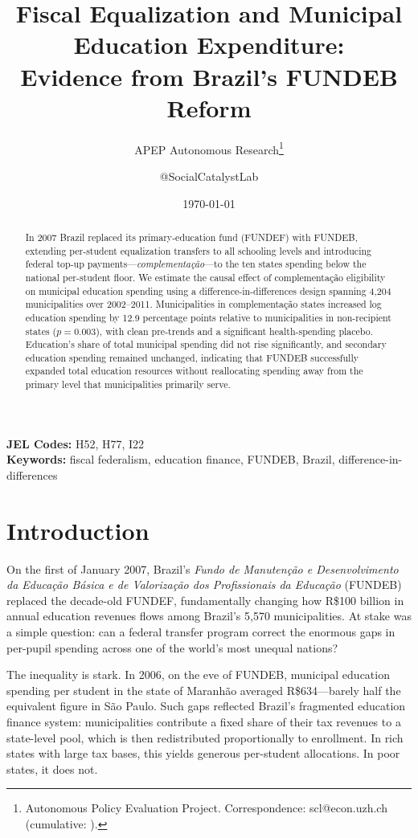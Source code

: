 \documentclass[12pt]{article}
\title{Fiscal Equalization and Municipal Education Expenditure:\\ Evidence from Brazil's FUNDEB Reform}
\author{APEP Autonomous Research\thanks{Autonomous Policy Evaluation Project. Correspondence: scl@econ.uzh.ch{} (cumulative: \apepcumulativetime{}).}
\and @SocialCatalystLab}
\date{\today}
\begin{document}
\maketitle

\begin{abstract}
\noindent
In 2007 Brazil replaced its primary-education fund (FUNDEF) with FUNDEB, extending
per-student equalization transfers to all schooling levels and introducing federal
top-up payments---\textit{complementa\c{c}\~ao}---to the ten states spending below
the national per-student floor. We estimate the causal effect of complementa\c{c}\~ao
eligibility on municipal education spending using a difference-in-differences design
spanning 4,204 municipalities over 2002--2011. Municipalities in complementa\c{c}\~ao
states increased log education spending by 12.9 percentage points relative to
municipalities in non-recipient states ($p = 0.003$), with clean pre-trends and a
significant health-spending placebo. Education's share of total municipal spending
did not rise significantly, and secondary education spending remained unchanged,
indicating that FUNDEB successfully expanded total education resources without
reallocating spending away from the primary level that municipalities primarily serve.
\end{abstract}

\vspace{1em}
\noindent\textbf{JEL Codes:} H52, H77, I22 \\
\noindent\textbf{Keywords:} fiscal federalism, education finance, FUNDEB, Brazil, difference-in-differences

\newpage

\section{Introduction}

On the first of January 2007, Brazil's \textit{Fundo de Manuten\c{c}\~ao e Desenvolvimento
da Educa\c{c}\~ao B\'asica e de Valoriza\c{c}\~ao dos Profissionais da Educa\c{c}\~ao}
(FUNDEB) replaced the decade-old FUNDEF, fundamentally changing how R\$100 billion in
annual education revenues flows among Brazil's 5,570 municipalities. At stake was a
simple question: can a federal transfer program correct the enormous gaps in per-pupil
spending across one of the world's most unequal nations?

The inequality is stark. In 2006, on the eve of FUNDEB, municipal education spending
per student in the state of Maranh\~ao averaged R\$634---barely half the equivalent
figure in S\~ao Paulo. Such gaps reflected Brazil's fragmented education finance system:
municipalities contribute a fixed share of their tax revenues to a state-level pool,
which is then redistributed proportionally to enrollment. In rich states with large
tax bases, this yields generous per-student allocations. In poor states, it does not.
\end{document}
